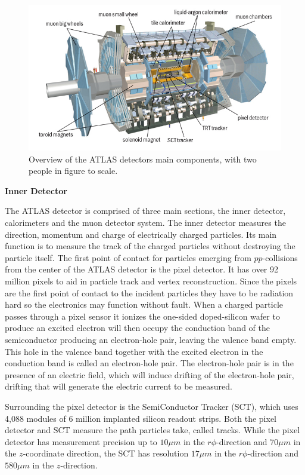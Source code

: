 \begin{figure}[h]
    \centering
    \includegraphics[width=.8\textwidth]{content/img/ATLAS_Detector.jpg}
    \caption{Overview of the ATLAS detectors main components, with two people in figure to scale.\cite{ATLAS_Illustration}}
    \label{fig:intro_ATLAS_detector}
\end{figure}

\noindent\textbf{Inner Detector}

The ATLAS detector is comprised of three main sections, the inner detector, calorimeters and the muon detector system. 
The inner detector measures the direction, momentum and charge of electrically charged particles.
Its main function is to measure the track of the charged particles without destroying the particle itself.
The first point of contact for particles emerging from $pp$-collisions from the center of the ATLAS detector is the pixel detector.\cite{PixelDetector_2008}
It has over 92 million pixels to aid in particle track and vertex reconstruction.
Since the pixels are the first point of contact to the incident particles they have to be radiation hard so the electronics may function without fault.
When a charged particle passes through a pixel sensor it ionizes the one-sided doped-silicon wafer to produce an excited electron will then occupy the conduction band of the semiconductor producing an electron-hole pair, leaving the valence band empty.\cite{KnollRadDetection}
This hole in the valence band together with the excited electron in the conduction band is called an electron-hole pair.
The electron-hole pair is in the presence of an electric field, which will induce drifting of the electron-hole pair, drifting that will generate the electric current to be measured.

Surrounding the pixel detector is the SemiConductor Tracker (SCT), which uses 4,088 modules of 6 million implanted silicon readout strips.\cite{ABDESSELAM2006642}
Both the pixel detector and SCT measure the path particles take, called tracks.
While the pixel detector has measurement precision up to $10 \mu m$ in the $r\phi$-direction and $70 \mu m$ in the $z$-coordinate direction,\cite{Andreazza:1287089} the SCT has resolution $17 \mu m$ in the $r\phi$-direction and $580 \mu m$ in the $z$-direction. 

